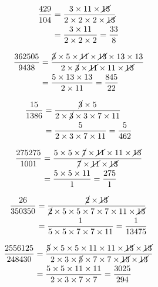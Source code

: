 {{\item\begin{align*}
    \frac{429}{104} &=
    \frac{3 \times 11 \times \cancel{13}}
    {2 \times 2 \times 2 \times \cancel{13}}\\ &=
    \frac{3 \times 11}
    {2 \times 2 \times 2} =
    \frac{33}{8}
    \end{align*}

\item\begin{align*}
    \frac{362505}{9438} &=
    \frac{\cancel{3} \times 5 \times \cancel{11} \times \cancel{13} \times 13 \times 13}
    {2 \times \cancel{3} \times \cancel{11} \times 11 \times \cancel{13}}\\ &=
    \frac{5 \times 13 \times 13}
    {2 \times 11} =
    \frac{845}{22}
    \end{align*}

\item\begin{align*}
    \frac{15}{1386} &=
    \frac{\cancel{3} \times 5}
    {2 \times \cancel{3} \times 3 \times 7 \times 11}\\ &=
    \frac{5}
    {2 \times 3 \times 7 \times 11} =
    \frac{5}{462}
    \end{align*}

\item\begin{align*}
    \frac{275275}{1001} &=
    \frac{5 \times 5 \times \cancel{7} \times \cancel{11} \times 11 \times \cancel{13}}
    {\cancel{7} \times \cancel{11} \times \cancel{13}}\\ &=
    \frac{5 \times 5 \times 11}
    {1} =
    \frac{275}{1}
    \end{align*}

\item\begin{align*}
    \frac{26}{350350} &=
    \frac{\cancel{2} \times \cancel{13}}
    {\cancel{2} \times 5 \times 5 \times 7 \times 7 \times 11 \times \cancel{13}}\\ &=
    \frac{1}
    {5 \times 5 \times 7 \times 7 \times 11} =
    \frac{1}{13475}
    \end{align*}

\item\begin{align*}
    \frac{2556125}{248430} &=
    \frac{\cancel{5} \times 5 \times 5 \times 11 \times 11 \times \cancel{13} \times \cancel{13}}
    {2 \times 3 \times \cancel{5} \times 7 \times 7 \times \cancel{13} \times \cancel{13}}\\ &=
    \frac{5 \times 5 \times 11 \times 11}
    {2 \times 3 \times 7 \times 7} =
    \frac{3025}{294}
    \end{align*}

}}

